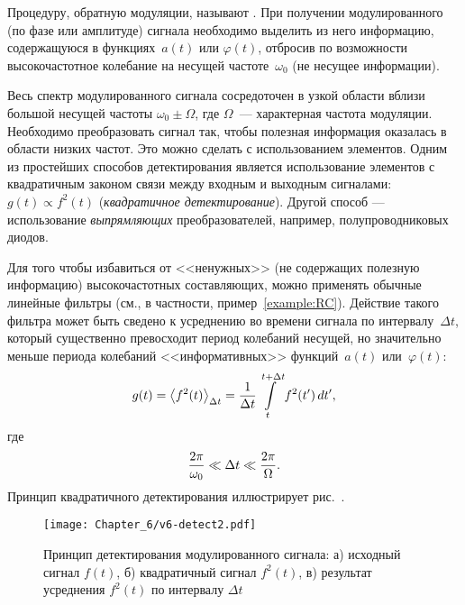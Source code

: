 
Процедуру, обратную модуляции, называют .
При получении модулированного (по фазе или амплитуде) сигнала необходимо
выделить из него информацию, содержащуюся в функциях~$a(t)$ или
$\varphi(t)$, отбросив по возможности высокочастотное колебание
на несущей частоте~$\omega_0$ (не несущее информации).

Весь спектр модулированного сигнала сосредоточен в узкой области
вблизи большой несущей частоты $\omega_0\pm \Omega$, где $\Omega$~---
характерная частота модуляции. Необходимо преобразовать сигнал так,
чтобы полезная информация оказалась в области низких частот. Это можно
сделать с использованием  элементов. 
Одним из простейших способов детектирования является использование 
элементов с квадратичным законом связи 
между входным и выходным сигналами:
$g(t)\propto f^2(t)$ (\emph{квадратичное детектирование}).
Другой способ --- использование \emph{выпрямляющих}
преобразователей, например, полупроводниковых диодов.

Для того чтобы избавиться от <<ненужных>> (не содержащих полезную
информацию) высокочастотных составляющих, можно применять обычные линейные
фильтры (см., в частности, пример~\ref{example:RC}). 
Действие такого фильтра может быть сведено к усреднению во времени
сигнала по интервалу~$\Delta t$, который существенно превосходит период
колебаний несущей, но значительно меньше периода колебаний <<информативных>>
функций~$a(t)$ или~$\varphi(t)$:
\begin{equation}
    \eqmark{averages-sq}
g(t) = \left<f^2(t)\right>_{\Delta t} = \frac{1}{\Delta t}
\int\limits_{t}^{t+\Delta t} f^2(t')\,dt',
\end{equation}
где
\begin{equation}
    \eqmark{averages-cond}
    \frac{2\pi}{\omega_0} \ll \Delta t \ll \frac{2\pi}{\Omega}.
\end{equation}
Принцип квадратичного детектирования иллюстрирует рис.~.
\begin{figure}[h]
 \texttt{[image: Chapter\_6/v6-detect2.pdf]}
 \caption{Принцип детектирования модулированного сигнала:
     а) исходный сигнал $f(t)$, б) квадратичный сигнал
 $f^2(t)$, в) результат усреднения $f^2(t)$ по интервалу $\Delta t$
}
\end{figure}

